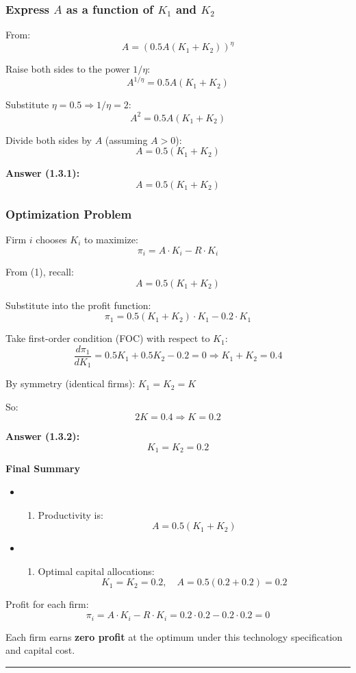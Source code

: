 \documentclass[
]{article}
\providecommand{\tightlist}{%
  \setlength{\itemsep}{0pt}\setlength{\parskip}{0pt}}
\begin{document}
\subsubsection{\texorpdfstring{Express \(A\) as a function of \(K_1\)
and
\(K_2\)}{Express A as a function of K\_1 and K\_2}}\label{express-a-as-a-function-of-k_1-and-k_2}

From: \[
A = (0.5A(K_1 + K_2))^\eta
\]

Raise both sides to the power \(1/\eta\): \[
A^{1/\eta} = 0.5A(K_1 + K_2)
\]

Substitute \(\eta = 0.5 \Rightarrow 1/\eta = 2\): \[
A^2 = 0.5A(K_1 + K_2)
\]

Divide both sides by \(A\) (assuming \(A > 0\)): \[
A = 0.5(K_1 + K_2)
\]

\textbf{Answer (1.3.1):} \[
A = 0.5(K_1 + K_2)
\]

\subsubsection{Optimization Problem}\label{optimization-problem}

Firm \(i\) chooses \(K_i\) to maximize: \[
\pi_i = A \cdot K_i - R \cdot K_i
\]

From (1), recall: \[
A = 0.5(K_1 + K_2)
\]

Substitute into the profit function: \[
\pi_1 = 0.5(K_1 + K_2) \cdot K_1 - 0.2 \cdot K_1
\]

Take first-order condition (FOC) with respect to \(K_1\): \[
\frac{d\pi_1}{dK_1} = 0.5K_1 + 0.5K_2 - 0.2 = 0
\Rightarrow K_1 + K_2 = 0.4
\]

By symmetry (identical firms): \(K_1 = K_2 = K\)

So: \[
2K = 0.4 \Rightarrow K = 0.2
\]

\textbf{Answer (1.3.2):} \[
K_1 = K_2 = 0.2
\]

\textbf{Final Summary}

\begin{itemize}
\tightlist
\item
  \begin{enumerate}
  \def\labelenumi{(\arabic{enumi})}
  \tightlist
  \item
    Productivity is: \[
    A = 0.5(K_1 + K_2)
    \]
  \end{enumerate}
\item
  \begin{enumerate}
  \def\labelenumi{(\arabic{enumi})}
  \setcounter{enumi}{1}
  \tightlist
  \item
    Optimal capital allocations: \[
    K_1 = K_2 = 0.2, \quad A = 0.5(0.2 + 0.2) = 0.2
    \]
  \end{enumerate}
\end{itemize}

Profit for each firm: \[
\pi_i = A \cdot K_i - R \cdot K_i = 0.2 \cdot 0.2 - 0.2 \cdot 0.2 = 0
\]

Each firm earns \textbf{zero profit} at the optimum under this
technology specification and capital cost.

\begin{center}\rule{0.5\linewidth}{0.5pt}\end{center}
\end{document}
